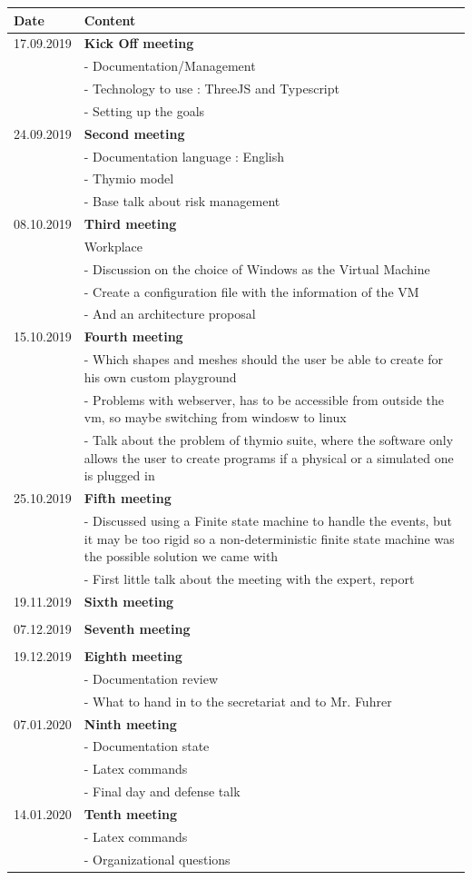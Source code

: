 \documentclass{scrreprt}
\begin{document}
\begin{tabular}{ | m{3cm} | m{10cm} | }
  \hline
  Date & Content \\
  \hline
  17.09.2019 & \textbf{Kick Off meeting}\\
  & - Documentation/Management\\
  & - Technology to use : ThreeJS and Typescript\\
  & - Setting up the goals\\
  \hline
  24.09.2019 & \textbf{Second meeting} \\
  & - Documentation language : English \\
  & - Thymio model \\
  & - Base talk about risk management \\
  \hline
  08.10.2019 & \textbf{Third meeting}\\
  & Workplace\\
  & - Discussion on the choice of Windows as the Virtual Machine \\
  & - Create a configuration file with the information of the VM \\
  & - And an architecture proposal \\
  \hline
  15.10.2019 & \textbf{Fourth meeting} \\
  & - Which shapes and meshes should the user be able to create for his own custom playground \\
  & - Problems with webserver, has to be accessible from outside the vm, so maybe switching from windosw to linux \\
  & - Talk about the problem of thymio suite, where the software only allows the user to create programs if a physical or a simulated one is plugged in \\
  \hline
  25.10.2019 & \textbf{Fifth meeting} \\
  & - Discussed using a Finite state machine to handle the events, but it may be too rigid so a non-deterministic finite state machine was the possible solution we came with \\
  & - First little talk about the meeting with the expert, report\\
  \hline
  19.11.2019 & \textbf{Sixth meeting} \\
  & \\
  \hline
  07.12.2019 & \textbf{Seventh meeting} \\
  & \\
  \hline
  19.12.2019 & \textbf{Eighth meeting} \\
  & - Documentation review\\
  & - What to hand in to the secretariat and to Mr. Fuhrer\\
  \hline
  07.01.2020 & \textbf{Ninth meeting} \\
  & - Documentation state\\
  & - Latex commands\\
  & - Final day and defense talk\\
  \hline
  14.01.2020 & \textbf{Tenth meeting} \\
  & - Latex commands\\
  & - Organizational questions\\
 \hline
\end{tabular}
\end{document}
